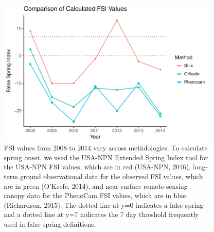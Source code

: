 \documentclass{article}\usepackage[]{graphicx}\usepackage[]{color}
\makeatletter
\def\maxwidth{ %
  \ifdim\Gin@nat@width>\linewidth
    \linewidth
  \else
    \Gin@nat@width
  \fi
}
\makeatother
\begin{document}
\begin{figure}[H]

{\centering \includegraphics[width=\maxwidth]{figure/fsifig-1} 

}

\caption[FSI values from 2008 to 2014 vary across methdologies]{FSI values from 2008 to 2014 vary across methdologies. To calculate spring onset, we used the USA-NPN Extended Spring Index tool for the USA-NPN FSI values, which are in red (USA-NPN, 2016), long-term ground observational data for the observed FSI values, which are in green (O'Keefe, 2014), and near-surface remote-sensing canopy data for the PhenoCam FSI values, which are in blue (Richardson, 2015). The dotted line at y=0 indicates a false spring and a dotted line at y=7 indicates the 7 day threshold frequently used in false spring definitions.}\label{fig:fsifig}
\end{figure}
\end{document}
